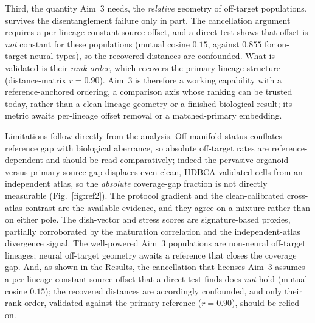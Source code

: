 \documentclass[11pt]{article}
\begin{document}
Third, the quantity Aim~3 needs, the \emph{relative} geometry of off-target populations, survives the
disentanglement failure only in part. The cancellation argument requires a per-lineage-constant source
offset, and a direct test shows that offset is \emph{not} constant for these populations (mutual cosine
$0.15$, against $0.855$ for on-target neural types), so the recovered distances are confounded. What is
validated is their \emph{rank order}, which recovers the primary lineage structure (distance-matrix
$r=0.90$). Aim~3 is therefore a working capability with a reference-anchored ordering, a comparison axis
whose ranking can be trusted today, rather than a clean lineage geometry or a finished biological
result; its metric awaits per-lineage offset removal or a matched-primary embedding.

Limitations follow directly from the analysis. Off-manifold status conflates reference gap with
biological aberrance, so absolute off-target rates are reference-dependent and should be read
comparatively; indeed the pervasive organoid-versus-primary source gap displaces even clean,
HDBCA-validated cells from an independent atlas, so the \emph{absolute} coverage-gap fraction is not
directly measurable (Fig.~\ref{fig:ref2}). The protocol gradient and the clean-calibrated cross-atlas
contrast are the available evidence, and they agree on a mixture rather than on either pole. The
dish-vector and stress scores are signature-based proxies, partially corroborated by the maturation
correlation and the independent-atlas divergence signal. The well-powered Aim~3
populations are non-neural off-target lineages; neural off-target geometry awaits a reference that
closes the coverage gap. And, as shown in the Results, the cancellation that licenses Aim~3 assumes a
per-lineage-constant source offset that a direct test finds does \emph{not} hold (mutual cosine $0.15$);
the recovered distances are accordingly confounded, and only their rank order, validated against the
primary reference ($r=0.90$), should be relied on.
\end{document}
